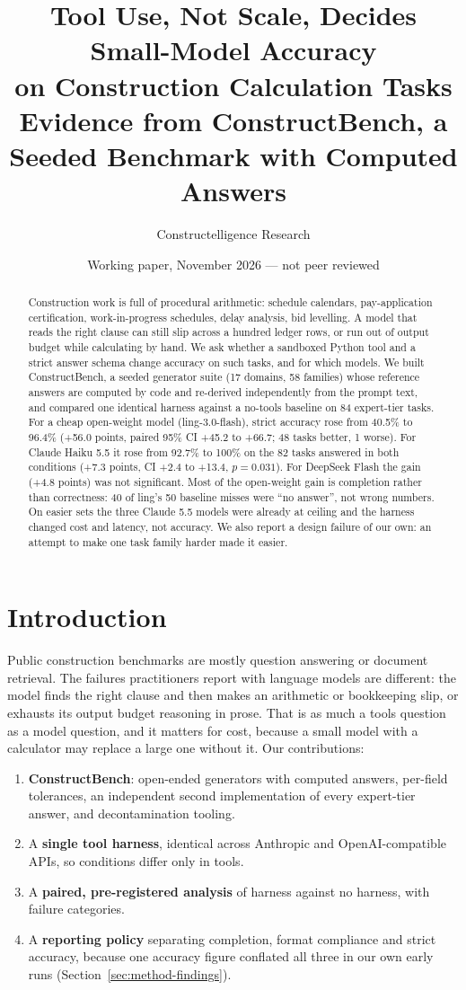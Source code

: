 \documentclass[11pt]{article}
\title{\bfseries Tool Use, Not Scale, Decides Small-Model Accuracy\\on Construction Calculation Tasks\\[2pt]\large Evidence from ConstructBench, a Seeded Benchmark with Computed Answers}
\author{Constructelligence Research}
\date{\small Working paper, November 2026 --- not peer reviewed}
\begin{document}
\maketitle
\begin{abstract}\noindent
Construction work is full of procedural arithmetic: schedule calendars, pay-application certification, work-in-progress schedules, delay analysis, bid levelling. A model that reads the right clause can still slip across a hundred ledger rows, or run out of output budget while calculating by hand. We ask whether a sandboxed Python tool and a strict answer schema change accuracy on such tasks, and for which models. We built ConstructBench, a seeded generator suite (17 domains, 58 families) whose reference answers are computed by code and re-derived independently from the prompt text, and compared one identical harness against a no-tools baseline on 84 expert-tier tasks. For a cheap open-weight model (ling-3.0-flash), strict accuracy rose from 40.5\% to 96.4\% (+56.0 points, paired 95\% CI +45.2 to +66.7; 48 tasks better, 1 worse). For Claude Haiku 5.5 it rose from 92.7\% to 100\% on the 82 tasks answered in both conditions (+7.3 points, CI +2.4 to +13.4, $p=0.031$). For DeepSeek Flash the gain (+4.8 points) was not significant. Most of the open-weight gain is completion rather than correctness: 40 of ling's 50 baseline misses were ``no answer'', not wrong numbers. On easier sets the three Claude 5.5 models were already at ceiling and the harness changed cost and latency, not accuracy. We also report a design failure of our own: an attempt to make one task family harder made it easier.
\end{abstract}

\section{Introduction}
Public construction benchmarks are mostly question answering or document retrieval. The failures practitioners report with language models are different: the model finds the right clause and then makes an arithmetic or bookkeeping slip, or exhausts its output budget reasoning in prose. That is as much a tools question as a model question, and it matters for cost, because a small model with a calculator may replace a large one without it. Our contributions:
\begin{enumerate}
\item \textbf{ConstructBench}: open-ended generators with computed answers, per-field tolerances, an independent second implementation of every expert-tier answer, and decontamination tooling.
\item A \textbf{single tool harness}, identical across Anthropic and OpenAI-compatible APIs, so conditions differ only in tools.
\item A \textbf{paired, pre-registered analysis} of harness against no harness, with failure categories.
\item A \textbf{reporting policy} separating completion, format compliance and strict accuracy, because one accuracy figure conflated all three in our own early runs (Section~\ref{sec:method-findings}).
\end{enumerate}
\end{document}
